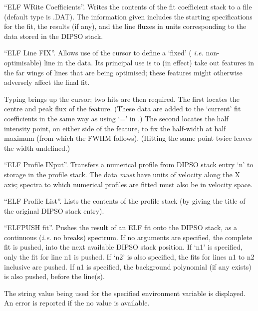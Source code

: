 \begin {description}
``ELF WRite Coefficients''. Writes the contents of the fit coefficient
stack to a file (default type is .DAT). The information given includes
the starting specifications for the fit, the results (if any), and the
line fluxes in units corresponding to the data stored in the DIPSO
stack.

``ELF Line FIX''. Allows use of the cursor to define a `fixed' ({\em
i.e.} non-optimisable) line in the data. Its principal use is to (in
effect) take out features in the far wings of lines that are being
optimised; these features might otherwise adversely affect the final
fit.

Typing   brings up the cursor; two hits are then required. The
first locates the centre and peak flux of the feature. (These data are
added to the `current' fit coefficients in the same way as using `='
in .)  The second locates the half intensity point, on either
side of the feature, to fix the half-width at half maximum (from which
the FWHM follows). (Hitting the same point twice leaves the width
undefined.)

``ELF Profile INput''. Transfers a numerical profile from DIPSO stack
entry `n' to storage in the profile stack. The data {\em must} have
units of velocity along the X axis; spectra to which numerical
profiles are fitted must also be in velocity space.

``ELF Profile List''. Lists the contents of the profile stack (by
giving the title of the original DIPSO stack entry).

``ELFPUSH fit''. Pushes the result of an ELF fit onto the DIPSO
stack, as a continuous ({\em i.e.} no breaks) spectrum. If no
arguments are specified, the complete fit is pushed, into the next
available DIPSO stack position. If `n1' is specified, only the fit for
line n1 is pushed. If `n2' is also specified, the fits for lines n1 to
n2 inclusive are pushed. If n1 is specified, the background polynomial
(if any exists) is also pushed, before the line(s).

The string value being used for the specified environment variable is
displayed. An error is reported if the no value is available.


\end{description}
